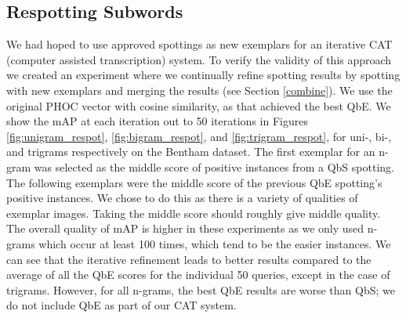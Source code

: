 \documentclass[ms,electronic,twosidetoc,letterpaper,chaptercenter,parttop,lof,lot]{byumsphd}
\begin{document}

\subsection{Respotting Subwords}

We had hoped to use approved spottings as new exemplars for an iterative CAT (computer assisted transcription) system. To verify the validity of this approach we created an experiment where we continually refine spotting results by spotting with new exemplars and merging the results (see Section \ref{combine}). We use the original PHOC vector with cosine similarity, as that achieved the best QbE. We show the mAP at each iteration out to 50 iterations in Figures \ref{fig:unigram_respot}, \ref{fig:bigram_respot}, and \ref{fig:trigram_respot}, for uni-, bi-, and trigrams respectively on the Bentham dataset. The first exemplar for an n-gram was selected as the middle score of positive instances from a QbS spotting. The following exemplars were the middle score of the previous QbE spotting's positive instances. We chose to do this as there is a variety of qualities of exemplar images. Taking the middle score should roughly give middle quality.
The overall quality of mAP is higher in these experiments as we only used n-grams which occur at least 100 times, which tend to be the easier instances.
We can see that the iterative refinement leads to better results compared to the average of all the QbE scores for the individual 50 queries, except in the case of trigrams. 
However, for all n-grams, the best QbE results are worse than QbS; we do not include QbE as part of our CAT system.
\end{document}

